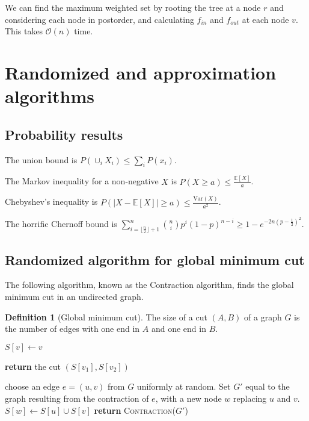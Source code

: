 \documentclass[10pt, oneside, reqno]{amsart}
\theoremstyle{plain}%
\theoremstyle{definition}
\newtheorem{defn}[thm]{Definition}
\theoremstyle{remark}
\newcommand{\expc}[1]{\mathbb{E}\left[#1\right]}
\newcommand{\bigo}[1]{\mathcal{O}(#1)}
\begin{document}
We can find the maximum weighted set by rooting the tree at a node $r$ and considering each node in postorder, and calculating $f_{in}$ and $f_{out}$ at each node $v$. This takes $\bigo{n}$ time.




\section{Randomized and approximation algorithms} %
\label{sec:probabilistic_algorithms}

\subsection{Probability results} %
The union bound is $P(\cup_i X_i) \leq \sum_i P(x_i)$.

The Markov inequality for a non-negative $X$ is $P(X \geq a) \leq \frac{\expc X}{a}$.

Chebyshev's inequality is $P(\left | X - \expc X \right | \geq a) \leq \frac {\textrm{Var}(X)}{a^2}$.

The horrific Chernoff bound is $\sum\limits_{i = \lfloor \frac{n}{2} \rfloor + 1}^n \binom{n}{i}p^i (1 - p)^{n - i} \geq  1-e^{- 2n \left( {p - \frac{1}{2}} \right)^2}$.

\subsection{Randomized algorithm for global minimum cut} %
\label{sub:probabilistic_algorithm_for_global_minimum_cut}
The following algorithm, known as the Contraction algorithm, finds the global minimum cut in an undirected graph.

\begin{defn}[Global minimum cut]
	The size of a cut $(A,B)$ of a graph $G$ is the number of edges with one end in $A$ and one end in $B$.
\end{defn}


\begin{algorithm}[H]
	\label{alg:dynamic_rising_trend}
	\caption{The Contraction algorithm for finding the global minimum cut}
	\begin{algorithmic}[1]
		 $S[v] \gets v$ \EndFor
		
		 \textbf{return} the cut $(S[v_1], S[v_2])$
		
		\Else
			\State choose an edge $e = (u,v)$ from $G$ uniformly at random.
			\State Set $G'$ equal to the graph resulting from the contraction of $e$, with a new node $w$ replacing $u$ and $v$.
			\State $S[w] \gets S[u] \cup S[v]$ 
			\State \textbf{return} \textsc{Contraction}($G'$)
		\EndIf
	\EndProcedure
	\end{algorithmic}
\end{algorithm}
\end{document}
